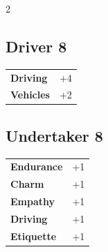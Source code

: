 \begin{multicols}{2}
\begin{tcolorbox}

\end{tcolorbox}

\begin{tcolorbox}
    \subsection*{Driver \hfill \small{8 }}
    \tcblower




\begin{tabular}{@{}ll@{}}
    \textbf{Driving} & +4\\
    \textbf{Vehicles} & +2\\
\end{tabular}


\end{tcolorbox}

\begin{tcolorbox}
    \subsection*{Undertaker \hfill \small{8 }}
    \tcblower




\begin{tabular}{@{}ll@{}}
    \textbf{Endurance} & +1\\
    \textbf{Charm} & +1\\
    \textbf{Empathy} & +1\\
    \textbf{Driving} & +1\\
    \textbf{Etiquette} & +1\\
\end{tabular}



\end{tcolorbox}
\end{multicols}

